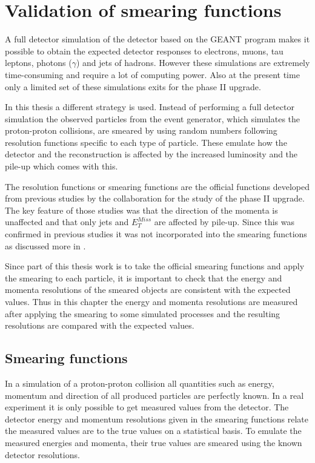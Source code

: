 \chapter{Validation of smearing functions}\label{cha:vali}
A full detector simulation of the \abbrATLAS detector based on the GEANT \citep{Geant4} program makes it possible to obtain the expected detector responses to electrons, muons, tau leptons, photons ($\gamma$) and jets of hadrons. However these simulations are extremely time-consuming and require a lot of computing power. Also at the present time only a limited set of these simulations exits for the \abbrATLAS phase II upgrade.

In this thesis a different strategy is used. Instead of performing a full detector simulation the observed particles from the event generator, which simulates the proton-proton collisions, are smeared by using random numbers following resolution functions specific to each type of particle. These emulate how the detector and the reconstruction is affected by the increased luminosity and the pile-up which comes with this. 

The resolution functions or smearing functions are the official functions developed from previous studies \citep{ATLAS:LOI2, ATL-PHYS-PUB-2013-004} by the \abbrATLAS collaboration for the study of the \abbrATLAS phase II upgrade. The key feature of those studies was that the direction of the momenta is unaffected and that only jets and $E^{Miss}_T$ are affected by pile-up. Since this was confirmed in previous studies it was not incorporated into the smearing functions as discussed more in .

Since part of this thesis work is to take the official \abbrATLAS smearing functions and apply the smearing to each particle, it is important to check that the energy and momenta resolutions of the smeared objects are consistent with the expected values. Thus in this chapter the energy and momenta resolutions are measured after applying the smearing to some simulated processes and the resulting resolutions are compared with the expected values.

\newpage
\section{Smearing functions}\label{sec:smear}
In a simulation of a proton-proton collision all quantities such as energy, momentum and direction of all produced particles are perfectly known. In a real experiment it is only possible to get measured values from the detector. The detector energy and momentum resolutions given in the smearing functions relate the measured values are to the true values on a statistical basis. To emulate the measured energies and momenta, their true values are smeared using the known detector resolutions. 

